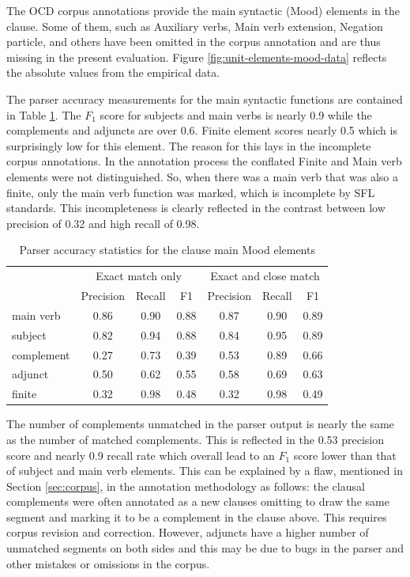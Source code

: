    The OCD corpus annotations provide the main syntactic (Mood) elements in the clause. Some of them, such as Auxiliary verbs, Main verb extension, Negation particle, and others have been omitted in the corpus annotation and are thus missing in the present evaluation. Figure \ref{fig:unit-elements-mood-data} reflects the absolute values from the empirical data. 
    
    The parser accuracy measurements for the main syntactic functions are contained in Table \ref{tab:unit-elements-mood-combined-F1}. The $F_1$ score for subjects and main verbs is nearly 0.9 while the complements and adjuncts are over 0.6. Finite element scores nearly 0.5 which is surprisingly low for this element. The reason for this lays in the incomplete corpus annotations. In the annotation process the conflated Finite and Main verb elements were not distinguished. So, when there was a main verb that was also a finite, only the main verb function was marked, which is incomplete by SFL standards. This incompleteness is clearly reflected in the contrast between low precision of 0.32 and high recall of 0.98. 
    
    \begin{table}[!ht]
    \centering
    \begin{tabular}{lcccccc}
    \toprule
     & \multicolumn{3}{c}{Exact match only} & \multicolumn{3}{c}{Exact and close match} \\ \cline{2-7} 
     & Precision & Recall & F1 & Precision & Recall & F1 \\ 
    \midrule
    main verb & 0.86 & 0.90 & 0.88 & 0.87 & 0.90 & 0.89 \\
    subject & 0.82 & 0.94 & 0.88 & 0.84 & 0.95 & 0.89 \\
    complement & 0.27 & 0.73 & 0.39 & 0.53 & 0.89 & 0.66 \\
    adjunct & 0.50 & 0.62 & 0.55 & 0.58 & 0.69 & 0.63 \\
    finite & 0.32 & 0.98 & 0.48 & 0.32 & 0.98 & 0.49 \\
    \bottomrule
    \end{tabular}
    \caption{Parser accuracy statistics for the clause main Mood elements}
    \label{tab:unit-elements-mood-combined-F1}
    \end{table}
    
    The number of complements unmatched in the parser output is nearly the same as the number of matched complements. This is reflected in the 0.53 precision score and nearly 0.9 recall rate which overall lead to an $F_1$ score lower than that of subject and main verb elements. This can be explained by a flaw, mentioned in Section \ref{sec:corpus}, in the annotation methodology as follows: the clausal complements were often annotated as a new clauses omitting to draw the same segment and marking it to be a complement in the clause above. This requires corpus revision and correction. However, adjuncts have a higher number of unmatched segments on both sides and this may be due to bugs in the parser and other mistakes or omissions in the corpus.
    
